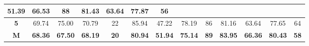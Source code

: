 \begin{table}[H]
{\begin{tabular}{c|cccc|cccc|cccc|}
			\multicolumn{1}{c|}{51.39} &
			\multicolumn{1}{c|}{66.53} &
			88 &
			\multicolumn{1}{c|}{81.43} &
			\multicolumn{1}{c|}{63.64} &
			\multicolumn{1}{c|}{77.87} &
			56 \\ \hline
			\multicolumn{1}{|c|}{\textbf{5}} &
			\multicolumn{1}{c|}{69.74} &
			\multicolumn{1}{c|}{75.00} &
			\multicolumn{1}{c|}{70.79} &
			22 &
			\multicolumn{1}{c|}{85.94} &
			\multicolumn{1}{c|}{47.22} &
			\multicolumn{1}{c|}{78.19} &
			86 &
			\multicolumn{1}{c|}{81.16} &
			\multicolumn{1}{c|}{63.64} &
			\multicolumn{1}{c|}{77.65} &
			64 \\ \hline
			\multicolumn{1}{|c|}{{\color[HTML]{00009B} \textbf{M}}} &
			\multicolumn{1}{c|}{{\color[HTML]{00009B} \textbf{68.36}}} &
			\multicolumn{1}{c|}{{\color[HTML]{00009B} \textbf{67.50}}} &
			\multicolumn{1}{c|}{{\color[HTML]{00009B} \textbf{68.19}}} &
			{\color[HTML]{00009B} \textbf{20}} &
			\multicolumn{1}{c|}{{\color[HTML]{00009B} \textbf{80.94}}} &
			\multicolumn{1}{c|}{{\color[HTML]{00009B} \textbf{51.94}}} &
			\multicolumn{1}{c|}{{\color[HTML]{00009B} \textbf{75.14}}} &
			{\color[HTML]{00009B} \textbf{89}} &
			\multicolumn{1}{c|}{{\color[HTML]{00009B} \textbf{83.95}}} &
			\multicolumn{1}{c|}{{\color[HTML]{00009B} \textbf{66.36}}} &
			\multicolumn{1}{c|}{{\color[HTML]{00009B} \textbf{80.43}}} &
			{\color[HTML]{00009B} \textbf{58}} \\ \hline
		\end{tabular}%
	}
\end{table}